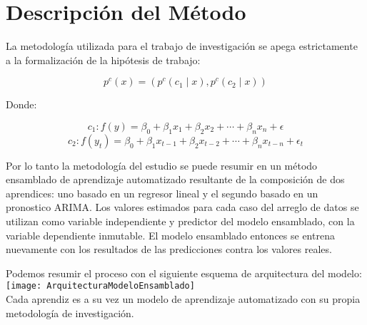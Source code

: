 \section{Descripción del Método}
La metodología utilizada para el trabajo de investigación se apega estrictamente a la formalización de la hipótesis de trabajo:

\[ p^{c}(x) = (p^{c}(c_{1} \mid x),p^{c}(c_{2} \mid x)) \]

Donde:

\[ c_{1} : f(y) = \beta_{0} + \beta_{1}x_{1} + \beta_{2}x_{2} + \cdots + \beta_{n}x_{n} + \epsilon \]
\[ c_{2} : f(y_{t}) = \beta_{0} + \beta_{1}x_{t-1} + \beta_{2}x_{t-2} + \cdots + \beta_{n}x_{t-n} + \epsilon_{t}\]

Por lo tanto la metodología del estudio se puede resumir en un método ensamblado de aprendizaje automatizado resultante de la composición de dos aprendices: uno basado en un regresor lineal y el segundo basado en un pronostico ARIMA. Los valores estimados para cada caso del arreglo de datos se utilizan como variable independiente y predictor del modelo ensamblado, con la variable dependiente inmutable. El modelo ensamblado entonces se entrena nuevamente con los resultados de las predicciones contra los valores reales.   

Podemos resumir el proceso con el siguiente esquema de arquitectura del modelo:\\

\texttt{[image: ArquitecturaModeloEnsamblado]}\\

Cada aprendiz es a su vez un modelo de aprendizaje automatizado con su propia metodología de investigación. 

